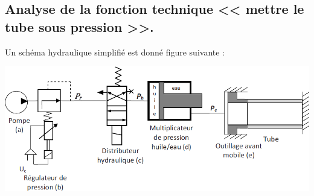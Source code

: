 \documentclass[10pt,fleqn]{article} %
\begin{document}
\begin{multicols}{2}
\fi
\subsection*{Analyse de la fonction technique << mettre le tube sous pression >>.}


\ifprof
\else
Un schéma hydraulique simplifié est donné figure suivante :
\begin{center}
\includegraphics[width=\linewidth]{images_02/fig_01}
\end{center}
\fi
%


\end{multicols}
\end{document}
